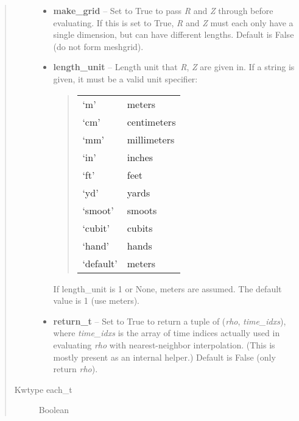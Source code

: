 \documentclass[letterpaper,10pt,english]{sphinxmanual}
\begin{document}
\begin{fulllineitems}
\begin{fulllineitems}
\begin{quote}
\begin{description}
\begin{itemize}
\item {} 
\textbf{make\_grid} -- Set to True to pass \emph{R} and \emph{Z} through
 before evaluating. If this is set to
True, \emph{R} and \emph{Z} must each only have a single dimension, but
can have different lengths. Default is False (do not form
meshgrid).

\item {} 
\textbf{length\_unit} -- 
Length unit that \emph{R}, \emph{Z} are given in.
If a string is given, it must be a valid unit specifier:
\begin{quote}

\begin{tabulary}{\linewidth}{|L|L|}
\hline

`m'
 & 
meters
\\

`cm'
 & 
centimeters
\\

`mm'
 & 
millimeters
\\

`in'
 & 
inches
\\

`ft'
 & 
feet
\\

`yd'
 & 
yards
\\

`smoot'
 & 
smoots
\\

`cubit'
 & 
cubits
\\

`hand'
 & 
hands
\\

`default'
 & 
meters
\\
\hline\end{tabulary}

\end{quote}

If length\_unit is 1 or None, meters are assumed. The default
value is 1 (use meters).


\item {} 
\textbf{return\_t} -- Set to True to return a tuple of (\emph{rho},
\emph{time\_idxs}), where \emph{time\_idxs} is the array of time indices
actually used in evaluating \emph{rho} with nearest-neighbor
interpolation. (This is mostly present as an internal helper.)
Default is False (only return \emph{rho}).

\end{itemize}

\item[{Kwtype each\_t}] \leavevmode
Boolean


\end{description}
\end{quote}
\end{fulllineitems}
\end{fulllineitems}
\end{document}
